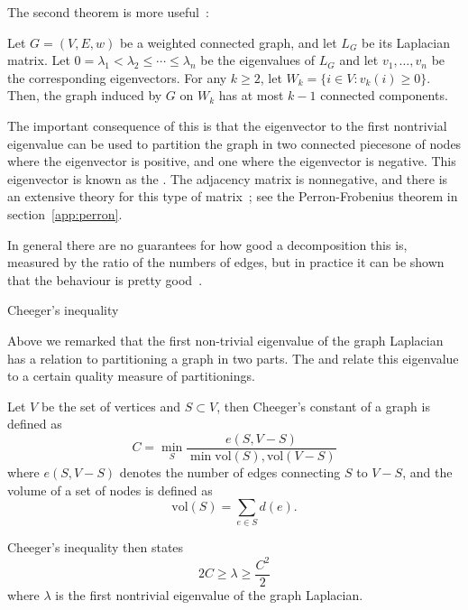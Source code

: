 The second theorem is more useful~\cite{Fiedler:75-property}:
\begin{theorem}
  Let $G = (V,E,w)$ be a weighted connected graph, and let $L_G$ be
  its Laplacian matrix. Let $0 = \lambda_1 < \lambda_2 \leq \cdots
  \leq \lambda_n$ be the eigenvalues of $L_G$ and let $v_1,\ldots,v_n$
  be the corresponding eigenvectors. For any $k \geq 2$, let $W_k
  =\{i\in V\colon v_k(i)\geq0\}$. Then, the graph induced by $G$ on $W_k$
  has at most $k-1$ connected components.
\end{theorem}

The important consequence of this is that the eigenvector to the first
nontrivial eigenvalue can be used to partition the graph in two
connected piecesone of nodes where the eigenvector is positive, and
one where the eigenvector is negative. This eigenvector is known as
the .
The adjacency matrix is nonnegative, and there is an extensive theory
for this type of matrix~\cite{BePl:book}; see the Perron-Frobenius
theorem in section~\ref{app:perron}.

In general there are no guarantees for how good a decomposition this
is, measured by the ratio of the numbers of edges, but in practice it
can be shown that the behaviour is pretty
good~\cite{Spielman96spectralpartitioning}.


 {Cheeger's inequality}

Above we remarked that the first non-trivial eigenvalue of the graph
Laplacian has a relation to partitioning a graph in two parts. The
 and
 relate this eigenvalue to a
certain quality measure of partitionings.

Let $V$ be the set of vertices and $S\subset V$, then Cheeger's
constant of a graph is defined as
\[ C=\min_S \frac{e(S,V-S)}
        {\min{\mathord{\mathrm{vol}}(S),\mathord{\mathrm{vol}}(V-S)}}
\]
where $e(S,V-S)$ denotes the number of edges connecting $S$ to $V-S$,
and the volume of a set of nodes is defined as
\[ \mathord{\mathrm{vol}}(S) = \sum_{e\in S}d(e). \]

Cheeger's inequality then states
\[ 2C \geq \lambda \geq \frac{C^2}2 \]
where $\lambda$ is the first nontrivial eigenvalue of the graph
Laplacian.

